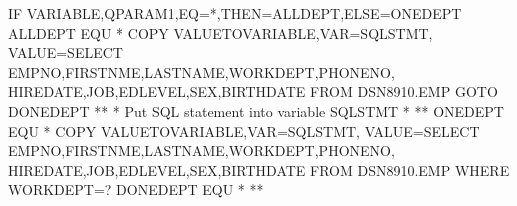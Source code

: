 \documentclass[letterpaper,10pt,english]{sphinxmanual}
\begin{document}
\begin{sphinxVerbatim}[commandchars=\\\{\}]
   IF\PYGZdl{}   VARIABLE,\PYGZsq{}QPARAM1\PYGZsq{},EQ=\PYGZsq{}*\PYGZsq{},THEN=ALLDEPT,ELSE=ONEDEPT
ALLDEPT  EQU   *
   COPY\PYGZdl{} VALUE\PYGZhy{}TO\PYGZhy{}VARIABLE,VAR=\PYGZsq{}SQLSTMT\PYGZsq{},                        \PYGZhy{}
         VALUE=\PYGZsq{}SELECT EMPNO,FIRSTNME,LASTNAME,WORKDEPT,PHONENO, \PYGZhy{}
         HIREDATE,JOB,EDLEVEL,SEX,BIRTHDATE                      \PYGZhy{}
         FROM DSN8910.EMP\PYGZsq{}
   GOTO\PYGZdl{} DONEDEPT
*\PYGZhy{}\PYGZhy{}\PYGZhy{}\PYGZhy{}\PYGZhy{}\PYGZhy{}\PYGZhy{}\PYGZhy{}\PYGZhy{}\PYGZhy{}\PYGZhy{}\PYGZhy{}\PYGZhy{}\PYGZhy{}\PYGZhy{}\PYGZhy{}\PYGZhy{}\PYGZhy{}\PYGZhy{}\PYGZhy{}\PYGZhy{}\PYGZhy{}\PYGZhy{}\PYGZhy{}\PYGZhy{}\PYGZhy{}\PYGZhy{}\PYGZhy{}\PYGZhy{}\PYGZhy{}\PYGZhy{}\PYGZhy{}\PYGZhy{}\PYGZhy{}\PYGZhy{}\PYGZhy{}\PYGZhy{}\PYGZhy{}\PYGZhy{}\PYGZhy{}\PYGZhy{}\PYGZhy{}\PYGZhy{}\PYGZhy{}\PYGZhy{}\PYGZhy{}\PYGZhy{}\PYGZhy{}\PYGZhy{}\PYGZhy{}\PYGZhy{}\PYGZhy{}\PYGZhy{}\PYGZhy{}\PYGZhy{}\PYGZhy{}\PYGZhy{}\PYGZhy{}\PYGZhy{}\PYGZhy{}\PYGZhy{}\PYGZhy{}\PYGZhy{}\PYGZhy{}\PYGZhy{}\PYGZhy{}\PYGZhy{}\PYGZhy{}\PYGZhy{}*
* Put SQL statement into variable SQLSTMT                             *
*\PYGZhy{}\PYGZhy{}\PYGZhy{}\PYGZhy{}\PYGZhy{}\PYGZhy{}\PYGZhy{}\PYGZhy{}\PYGZhy{}\PYGZhy{}\PYGZhy{}\PYGZhy{}\PYGZhy{}\PYGZhy{}\PYGZhy{}\PYGZhy{}\PYGZhy{}\PYGZhy{}\PYGZhy{}\PYGZhy{}\PYGZhy{}\PYGZhy{}\PYGZhy{}\PYGZhy{}\PYGZhy{}\PYGZhy{}\PYGZhy{}\PYGZhy{}\PYGZhy{}\PYGZhy{}\PYGZhy{}\PYGZhy{}\PYGZhy{}\PYGZhy{}\PYGZhy{}\PYGZhy{}\PYGZhy{}\PYGZhy{}\PYGZhy{}\PYGZhy{}\PYGZhy{}\PYGZhy{}\PYGZhy{}\PYGZhy{}\PYGZhy{}\PYGZhy{}\PYGZhy{}\PYGZhy{}\PYGZhy{}\PYGZhy{}\PYGZhy{}\PYGZhy{}\PYGZhy{}\PYGZhy{}\PYGZhy{}\PYGZhy{}\PYGZhy{}\PYGZhy{}\PYGZhy{}\PYGZhy{}\PYGZhy{}\PYGZhy{}\PYGZhy{}\PYGZhy{}\PYGZhy{}\PYGZhy{}\PYGZhy{}\PYGZhy{}\PYGZhy{}*
ONEDEPT  EQU   *
   COPY\PYGZdl{} VALUE\PYGZhy{}TO\PYGZhy{}VARIABLE,VAR=\PYGZsq{}SQLSTMT\PYGZsq{},                        \PYGZhy{}
         VALUE=\PYGZsq{}SELECT EMPNO,FIRSTNME,LASTNAME,WORKDEPT,PHONENO, \PYGZhy{}
         HIREDATE,JOB,EDLEVEL,SEX,BIRTHDATE                      \PYGZhy{}
         FROM DSN8910.EMP WHERE WORKDEPT=?\PYGZsq{}
DONEDEPT EQU   *
*\PYGZhy{}\PYGZhy{}\PYGZhy{}\PYGZhy{}\PYGZhy{}\PYGZhy{}\PYGZhy{}\PYGZhy{}\PYGZhy{}\PYGZhy{}\PYGZhy{}\PYGZhy{}\PYGZhy{}\PYGZhy{}\PYGZhy{}\PYGZhy{}\PYGZhy{}\PYGZhy{}\PYGZhy{}\PYGZhy{}\PYGZhy{}\PYGZhy{}\PYGZhy{}\PYGZhy{}\PYGZhy{}\PYGZhy{}\PYGZhy{}\PYGZhy{}\PYGZhy{}\PYGZhy{}\PYGZhy{}\PYGZhy{}\PYGZhy{}\PYGZhy{}\PYGZhy{}\PYGZhy{}\PYGZhy{}\PYGZhy{}\PYGZhy{}\PYGZhy{}\PYGZhy{}\PYGZhy{}\PYGZhy{}\PYGZhy{}\PYGZhy{}\PYGZhy{}\PYGZhy{}\PYGZhy{}\PYGZhy{}\PYGZhy{}\PYGZhy{}\PYGZhy{}\PYGZhy{}\PYGZhy{}\PYGZhy{}\PYGZhy{}\PYGZhy{}\PYGZhy{}\PYGZhy{}\PYGZhy{}\PYGZhy{}\PYGZhy{}\PYGZhy{}\PYGZhy{}\PYGZhy{}\PYGZhy{}\PYGZhy{}\PYGZhy{}\PYGZhy{}*

\end{sphinxVerbatim}
\end{document}
